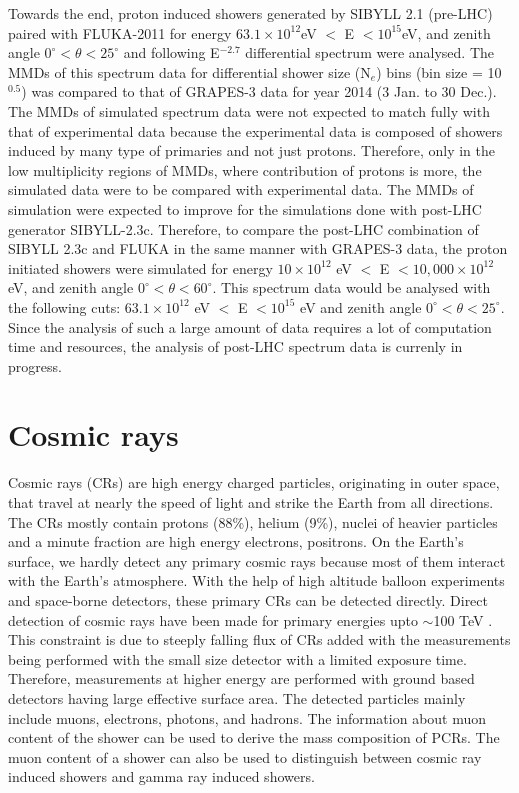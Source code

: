 \documentclass[12pt]{article}
\begin{document}
Towards the end, proton induced showers generated by SIBYLL 2.1 (pre-LHC) paired with FLUKA-2011 for energy $63.1\times10^{12}$eV $< $ E $< 10^{15}$eV, and zenith angle $0^\circ<\theta<25^\circ$ and following E$^{-2.7}$ differential spectrum were analysed. The MMDs of this spectrum data for differential shower size (N$_e$) bins (bin size = 10$^{0.5}$) was compared to that of GRAPES-3 data for year 2014 (3 Jan. to 30 Dec.). The MMDs of simulated spectrum data were not expected to match fully with that of experimental data because the experimental data is composed of showers induced by many type of primaries and not just protons\cite{tanaka}. Therefore, only in the low multiplicity regions of MMDs, where contribution of  protons is more, the simulated data were to be compared with experimental data. The MMDs of simulation were expected to improve for the simulations done with post-LHC generator SIBYLL-2.3c.  Therefore, to compare the post-LHC combination of SIBYLL 2.3c and FLUKA in the same manner with GRAPES-3 data, the proton initiated showers were simulated for energy $10\times10^{12}$ eV $<$  E $<10,000\times10^{12}$ eV, and zenith angle $0^\circ<\theta<60^\circ$. This spectrum data would be analysed with the following cuts: $63.1\times10^{12}$ eV $<$  E $< 10^{15}$ eV and zenith angle $0^\circ<\theta<25^\circ$. Since the analysis of such a large amount of data requires a lot of computation time and resources, the analysis of post-LHC spectrum data is currenly in progress.

 
\section{Cosmic rays}
Cosmic rays (CRs) are high energy charged particles, originating in outer space, that travel at nearly the speed of light and strike the Earth from all directions. The CRs mostly contain protons (88\%), helium (9\%), nuclei of heavier particles and a minute fraction are high energy electrons, positrons. On the Earth’s surface, we hardly detect any primary cosmic rays because most of them interact with the Earth’s atmosphere. With the help of high altitude balloon experiments and space-borne detectors, these primary CRs can be detected directly. Direct detection of cosmic rays have been made for primary energies upto $\sim$100 TeV \cite{anuj}. This constraint is due to steeply falling flux of CRs added with the measurements being performed with the small size detector with a limited exposure time. Therefore, measurements at higher energy are performed with ground based detectors having large effective surface area. 
The detected particles mainly include muons, electrons, photons,  and hadrons. The information about muon content of the shower can be used to derive the mass composition of PCRs\cite{tanaka}. The muon content of a shower can also be used to distinguish between cosmic ray induced showers and gamma ray induced showers. 
\end{document}
